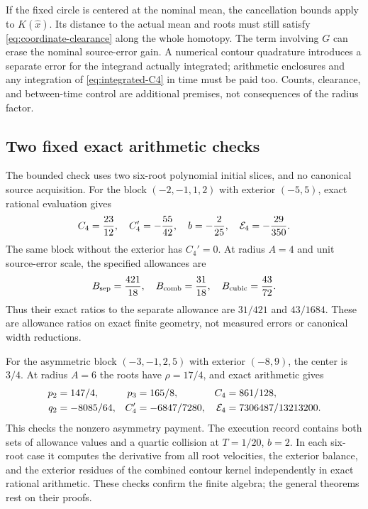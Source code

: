 If the fixed circle is centered at the nominal mean, the cancellation
bounds apply to $K(\widehat x)$. Its distance to the actual mean
and roots must still satisfy \eqref{eq:coordinate-clearance} along
the whole homotopy. The term involving $G$ can erase the nominal
source-error gain. A numerical contour quadrature introduces a
separate error for the integrand actually integrated; arithmetic
enclosures and any integration of \eqref{eq:integrated-C4} in time
must be paid too. Counts, clearance, and between-time control are
additional premises, not consequences of the radius factor.

\subsection{Two fixed exact arithmetic checks}
The bounded check uses two six-root polynomial initial slices,
and no canonical source acquisition. For the block
$(-2,-1,1,2)$ with exterior $(-5,5)$, exact rational evaluation gives
\begin{equation}
 C_4=\frac{23}{12},\quad C_4'=-\frac{55}{42},\quad
 b=-\frac2{25},\quad \mathcal E_4=-\frac{29}{350}.
 \label{eq:symmetric-example}
\end{equation}
The same block without the exterior has $C_4'=0$. At radius
$A=4$ and unit source-error scale, the specified allowances are
\begin{equation}
 B_{\rm sep}=\frac{421}{18},\quad
 B_{\rm comb}=\frac{31}{18},\quad
 B_{\rm cubic}=\frac{43}{72}.
 \label{eq:example-allowances}
\end{equation}
Thus their exact ratios to the separate allowance are $31/421$
and $43/1684$. These are allowance ratios on exact finite geometry,
not measured errors or canonical width reductions.

For the asymmetric block $(-3,-1,2,5)$ with exterior $(-8,9)$,
the center is $3/4$. At radius $A=6$ the roots have
$\rho=17/4$, and exact arithmetic gives
\begin{align}
 p_2&=147/4,&p_3&=165/8,&C_4&=861/128,\notag\\
 q_2&=-8085/64,&C_4'&=-6847/7280,&
 \mathcal E_4&=7306487/13213200.
 \label{eq:asymmetric-example}
\end{align}
This checks the nonzero asymmetry payment. The execution record
\cite{BakerAffineChecks2026} contains both sets of allowance values
and a quartic collision at $T=1/20$, $b=2$. In each six-root case
it computes the derivative from all root velocities, the exterior
balance, and the exterior residues of the combined contour kernel
independently in exact rational arithmetic. These checks confirm
the finite algebra; the general theorems rest on their proofs.
